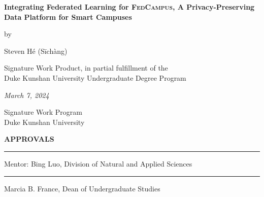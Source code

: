 \documentclass[11pt,a4paper,oneside]{report}
\newcommand{\fedcampus}{\textsc{FedCampus}\xspace}
\begin{document}
\newcommand{\authorname}{Steven Hé (Sīchàng)}

\newcommand{\thetitle}{Integrating Federated Learning for \fedcampus,
    A Privacy-Preserving Data Platform for Smart Campuses
}

\newcommand{\submissiondate}{March 7, 2024}

\newcommand{\mentor}{Bing Luo}

\newcommand{\academicunit}{Division of Natural and Applied Sciences}



\begin{titlepage}

    \vspace*{\bigskipamount}

    \begin{center}
        {\sffamily\LARGE\bfseries\MakeUppercase\thetitle\par}

        \bigskip

        by

        \bigskip

        {\Large \authorname}

        \bigskip

        Signature Work Product, in partial fulfillment of the \\
        Duke Kunshan University Undergraduate Degree Program

        \bigskip

        \emph{\submissiondate}

        \bigskip

        Signature Work Program \\
        Duke Kunshan University

    \end{center}

    \vfill

    \textbf{\textsf{APPROVALS}}

    \bigskip\bigskip\bigskip
    \hrule

    Mentor: \mentor, \academicunit

    \bigskip\bigskip\bigskip
    \hrule

    Marcia B. France, Dean of Undergraduate Studies

\end{titlepage}
\end{document}
